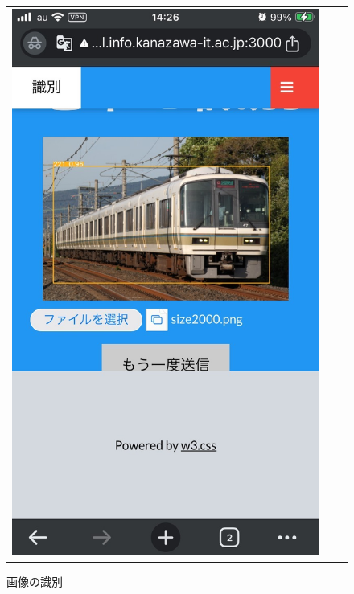 \begin{figure}[H]
\begin{tabular}{ccc}
\begin{minipage}[b]{0.3\textwidth}
			\caption{画像の分類}
			\label{img_cls}
		\end{minipage}
		\begin{minipage}[b]{0.3\textwidth}
			\centering
			\includegraphics[width=\linewidth]{chap2/fig/img_identify.jpg}
			\caption{画像の識別}
			\label{img_det}
		\end{minipage}
		\begin{minipage}[b]{0.3\textwidth}
			\centering

\end{minipage}
\end{tabular}
\end{figure}
